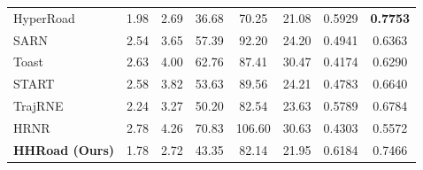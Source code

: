 \begin{table}[t]
{\begin{tabular}{l|cc|ccc|cc}
HyperRoad & 1.98 & 2.69 & 36.68 & 70.25 & 21.08 & 0.5929 & \textbf{0.7753} \\
SARN & 2.54 & 3.65 & 57.39 & 92.20 & 24.20 & 0.4941 & 0.6363 \\
Toast & 2.63 & 4.00 & 62.76 & 87.41 & 30.47 & 0.4174 & 0.6290 \\
START & 2.58 & 3.82 & 53.63 & 89.56 & 24.21 & 0.4783 & 0.6640 \\
TrajRNE & 2.24 & 3.27 & 50.20 & 82.54 & 23.63 & 0.5789 & 0.6784 \\
HRNR & 2.78 & 4.26 & 70.83 & 106.60 & 30.63 & 0.4303 & 0.5572 \\
\textbf{HHRoad (Ours)} & 1.78 & 2.72 & 43.35 & 82.14 & 21.95 & 0.6184 & 0.7466 \\
\bottomrule
\end{tabular}}
\end{table}